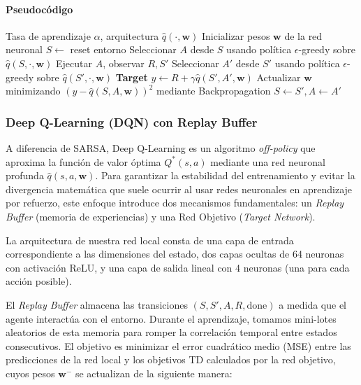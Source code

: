 \paragraph{Pseudocódigo}\mbox{}
\begin{algorithm}[H]
\caption{SARSA Semi-gradiente Deep}
\begin{algorithmic}[1]
\small
\Require Tasa de aprendizaje $\alpha$, arquitectura $\hat{q}(\cdot, \mathbf{w})$
\State Inicializar pesos $\mathbf{w}$ de la red neuronal
\State $S \gets$ reset entorno
\State Seleccionar $A$ desde $S$ usando política $\epsilon$-greedy sobre $\hat{q}(S, \cdot, \mathbf{w})$
\State Ejecutar $A$, observar $R, S'$
\State Seleccionar $A'$ desde $S'$ usando política $\epsilon$-greedy sobre $\hat{q}(S', \cdot, \mathbf{w})$
\State \textbf{Target} $y \gets R + \gamma \hat{q}(S', A', \mathbf{w})$
\State Actualizar $\mathbf{w}$ minimizando $(y - \hat{q}(S, A, \mathbf{w}))^2$ mediante Backpropagation
\State $S \gets S', A \gets A'$
\EndWhile
\EndFor
\end{algorithmic}
\end{algorithm}


\subsubsection{Deep Q-Learning (DQN) con Replay Buffer}

A diferencia de SARSA, Deep Q-Learning es un algoritmo \textit{off-policy} que aproxima la función de valor óptima $Q^*(s, a)$ mediante una red neuronal profunda $\hat{q}(s, a, \mathbf{w})$. Para garantizar la estabilidad del entrenamiento y evitar la divergencia matemática que suele ocurrir al usar redes neuronales en aprendizaje por refuerzo, este enfoque introduce dos mecanismos fundamentales: un \textit{Replay Buffer} (memoria de experiencias) y una Red Objetivo (\textit{Target Network}).

La arquitectura de nuestra red local consta de una capa de entrada correspondiente a las dimensiones del estado, dos capas ocultas de 64 neuronas con activación ReLU, y una capa de salida lineal con 4 neuronas (una para cada acción posible). 

El \textit{Replay Buffer} almacena las transiciones $(S, S', A, R, \text{done})$ a medida que el agente interactúa con el entorno. Durante el aprendizaje, tomamos mini-lotes aleatorios de esta memoria para romper la 
correlación temporal entre estados consecutivos. El objetivo es minimizar el 
error cuadrático medio (MSE) entre las predicciones de la red local y los 
objetivos TD calculados por la red objetivo, cuyos pesos $\mathbf{w}^-$ se actualizan de la siguiente manera:

